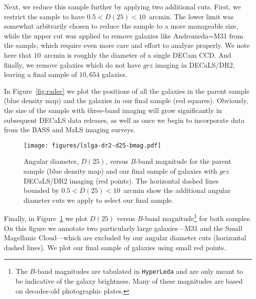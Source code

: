 Next, we reduce this sample further by applying two additional cuts.  First, we
restrict the sample to have $0.5<D(25)<10$~arcmin.  The lower limit was somewhat
arbitrarily chosen to reduce the sample to a more manageable size, while the
upper cut was applied to remove galaxies like Andromeda=M31 from the sample,
which require even more care and effort to analyze properly.  We note here that
$10$~arcmin is roughly the diameter of a single DECam CCD.  And finally, we
remove galaxies which do not have $grz$ imaging in DECaLS/DR2, leaving a final
sample of $10,654$ galaxies.

In Figure~\ref{fig:radec} we plot the positions of all the galaxies in the
parent sample (blue density map) and the galaxies in our final sample (red
squares).  Obviously, the size of the sample with three-band imaging will grow
significantly in subsequent DECaLS data releases, as well as once we begin to
incorporate data from the BASS and MzLS imaging surveys.

\begin{figure}[!ht]
\centering
\texttt{[image: figures/lslga-dr2-d25-bmag.pdf]}
\caption{Angular diameter, $D(25)$, versus $B$-band magnitude for the parent
  sample (blue density map) and our final sample of galaxies with $grz$
  DECaLS/DR2 imaging (red points).  The horizontal dashed lines bounded by 
  $0.5<D(25)<10$~arcmin show the additional angular diameter cuts we apply to
  select our final sample. \label{fig:d25}}
\end{figure}

Finally, in Figure~\ref{fig:d25} we plot $D(25)$ versus $B$-band
magnitude\footnote{The $B$-band magnitudes are tabulated in {\tt HyperLeda} and
  are only meant to be indicative of the galaxy brightness.  Many of these
  magnitudes are based on decades-old photographic plates.} for both samples.
On this figure we annotate two particularly large galaxies---M31 and the Small
Magellanic Cloud---which are excluded by our angular diameter cuts (horizontal
dashed lines).  We plot our final sample of galaxies using small red points.

